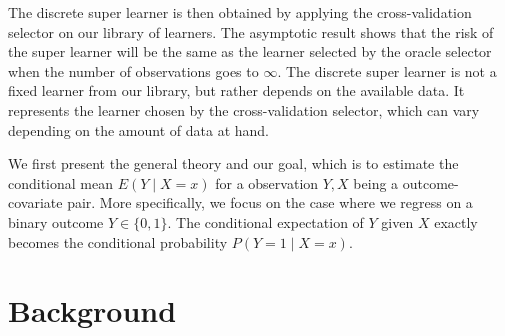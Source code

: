 \documentclass[11pt, a4paper]{article}
\theoremstyle{definition}
\theoremstyle{remark}
\begin{document}
The discrete super learner is then obtained by applying the cross-validation selector on our library of learners. The asymptotic result shows that the risk of the super learner will be the same as the learner selected by the oracle selector when the number of observations goes to $ \infty $. The discrete super learner is not a fixed learner from our library, but rather depends on the available data. It represents the learner chosen by the cross-validation selector, which can vary depending on the amount of data at hand.

We first present the general theory and our goal, which is to estimate the conditional mean $ E(Y \mid X = x) $ for a observation $ Y, X $ being a outcome-covariate pair. More specifically, we focus on the case where we regress on a binary outcome $ Y \in \{0,1\} $. The conditional expectation of $ Y $ given $ X $ exactly becomes the conditional probability $ P(Y = 1 \mid X = x) $.


\section{Background}
\end{document}
